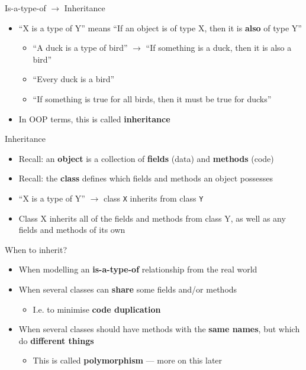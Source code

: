 \begin{frame}{Is-a-type-of $\to$ Inheritance}
\begin{itemize}
	\pause\item ``X is a type of Y'' means ``If an object is of type X, then it is \textbf{also} of type Y''
	\begin{itemize}
		\pause\item ``A duck is a type of bird'' $\to$ ``If something is a duck, then it is also a bird''
		\pause\item ``Every duck is a bird''
		\pause\item ``If something is true for all birds, then it must be true for ducks''
	\end{itemize}
	\pause\item In OOP terms, this is called \textbf{inheritance}
\end{itemize}
\end{frame}

\begin{frame}{Inheritance}
\begin{itemize}
	\pause\item Recall: an \textbf{object} is a collection of \textbf{fields} (data) and \textbf{methods} (code)
	\pause\item Recall: the \textbf{class} defines which fields and methods an object possesses
	\pause\item ``X is a type of Y'' $\to$ class \lstinline{X} inherits from class \lstinline{Y}
	\pause\item Class X inherits all of the fields and methods from class Y, as well as any fields and methods of its own
\end{itemize}
\end{frame}

\begin{frame}{When to inherit?}
\begin{itemize}
	\pause\item When modelling an \textbf{is-a-type-of} relationship from the real world
	\pause\item When several classes can \textbf{share} some fields and/or methods
	\begin{itemize}
		\pause\item I.e. to minimise \textbf{code duplication}
	\end{itemize}
	\pause\item When several classes should have methods with the \textbf{same names}, but which do \textbf{different things}
	\begin{itemize}
		\pause\item This is called \textbf{polymorphism} --- more on this later
	\end{itemize}
\end{itemize}
\end{frame}

